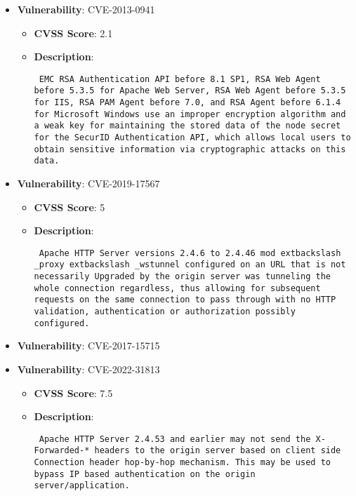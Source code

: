 \documentclass{article}
\begin{document}
\begin{itemize}
        \item \textbf{Vulnerability}: CVE-2013-0941
        \begin{itemize}
            \item \textbf{CVSS Score}:  2.1 
            \item \textbf{Description}: \parbox{\linewidth}{\texttt{ EMC RSA Authentication API before 8.1 SP1, RSA Web Agent before 5.3.5 for Apache Web Server, RSA Web Agent before 5.3.5 for IIS, RSA PAM Agent before 7.0, and RSA Agent before 6.1.4 for Microsoft Windows use an improper encryption algorithm and a weak key for maintaining the stored data of the node secret for the SecurID Authentication API, which allows local users to obtain sensitive information via cryptographic attacks on this data. }}
        \end{itemize}
    
        \item \textbf{Vulnerability}: CVE-2019-17567
        \begin{itemize}
            \item \textbf{CVSS Score}:  5 
            \item \textbf{Description}: \parbox{\linewidth}{\texttt{ Apache HTTP Server versions 2.4.6 to 2.4.46 mod	extbackslash _proxy	extbackslash _wstunnel configured on an URL that is not necessarily Upgraded by the origin server was tunneling the whole connection regardless, thus allowing for subsequent requests on the same connection to pass through with no HTTP validation, authentication or authorization possibly configured. }}
        \end{itemize}
    
        \item \textbf{Vulnerability}: CVE-2017-15715
    
        \item \textbf{Vulnerability}: CVE-2022-31813
        \begin{itemize}
            \item \textbf{CVSS Score}:  7.5 
            \item \textbf{Description}: \parbox{\linewidth}{\texttt{ Apache HTTP Server 2.4.53 and earlier may not send the X-Forwarded-* headers to the origin server based on client side Connection header hop-by-hop mechanism. This may be used to bypass IP based authentication on the origin server/application. }}
        \end{itemize}
    

\end{itemize}
\end{document}

